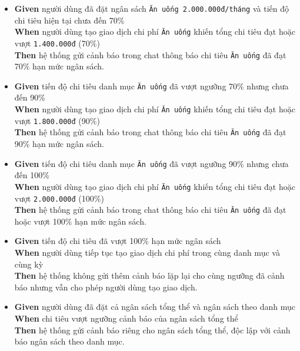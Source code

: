 \begin{itemize}
\item \textbf{Given} người dùng đã đặt ngân sách \texttt{Ăn uống 2.000.000đ/tháng} và tiến độ chi tiêu hiện tại chưa đến 70\%  \\ \hspace*{1.5em}  \textbf{When} người dùng tạo giao dịch chi phí \texttt{Ăn uống} khiến tổng chi tiêu đạt hoặc vượt \texttt{1.400.000đ} (70\%)  \\ \hspace*{1.5em}  \textbf{Then} hệ thống gửi cảnh báo trong chat thông báo chi tiêu \texttt{Ăn uống} đã đạt 70\% hạn mức ngân sách.
\item \textbf{Given} tiến độ chi tiêu danh mục \texttt{Ăn uống} đã vượt ngưỡng 70\% nhưng chưa đến 90\%  \\ \hspace*{1.5em}  \textbf{When} người dùng tạo giao dịch chi phí \texttt{Ăn uống} khiến tổng chi tiêu đạt hoặc vượt \texttt{1.800.000đ} (90\%)  \\ \hspace*{1.5em}  \textbf{Then} hệ thống gửi cảnh báo trong chat thông báo chi tiêu \texttt{Ăn uống} đã đạt 90\% hạn mức ngân sách.
\item \textbf{Given} tiến độ chi tiêu danh mục \texttt{Ăn uống} đã vượt ngưỡng 90\% nhưng chưa đến 100\%  \\ \hspace*{1.5em}  \textbf{When} người dùng tạo giao dịch chi phí \texttt{Ăn uống} khiến tổng chi tiêu đạt hoặc vượt \texttt{2.000.000đ} (100\%)  \\ \hspace*{1.5em}  \textbf{Then} hệ thống gửi cảnh báo trong chat thông báo chi tiêu \texttt{Ăn uống} đã đạt hoặc vượt 100\% hạn mức ngân sách.
\item \textbf{Given} tiến độ chi tiêu đã vượt 100\% hạn mức ngân sách  \\ \hspace*{1.5em}  \textbf{When} người dùng tiếp tục tạo giao dịch chi phí trong cùng danh mục và cùng kỳ  \\ \hspace*{1.5em}  \textbf{Then} hệ thống không gửi thêm cảnh báo lặp lại cho cùng ngưỡng đã cảnh báo nhưng vẫn cho phép người dùng tạo giao dịch.
\item \textbf{Given} người dùng đã đặt cả ngân sách tổng thể và ngân sách theo danh mục  \\ \hspace*{1.5em}  \textbf{When} chi tiêu vượt ngưỡng cảnh báo của ngân sách tổng thể  \\ \hspace*{1.5em}  \textbf{Then} hệ thống gửi cảnh báo riêng cho ngân sách tổng thể, độc lập với cảnh báo ngân sách theo danh mục.

\end{itemize}
